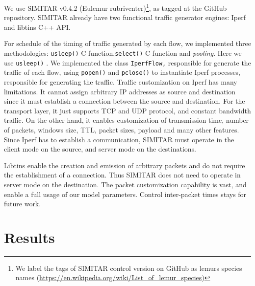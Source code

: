 We use SIMITAR v0.4.2 (Eulemur rubriventer)\footnote{ We label the tags of SIMITAR control version on GitHub as lemurs species names (\href{https://en.wikipedia.org/wiki/List_of_lemur_species}{https://en.wikipedia.org/wiki/List\_of\_lemur\_species})}, as tagged at the GitHub repository.  SIMITAR already have two functional traffic generator engines: Iperf and libtins C++ API.  

For schedule of the timing of traffic generated by each flow, we implemented three methodologies: \texttt{usleep()} C function,\texttt{select()} C function and \textit{pooling}. Here we use \texttt{usleep()} . We implemented the class \texttt{IperfFlow,} responsible for generate the traffic of each flow, using \texttt{popen()} and \texttt{pclose()} to instantiate Iperf processes, responsible for generating the traffic. Traffic customization on Iperf has many limitations. It cannot assign arbitrary IP addresses as source and destination since it must establish a connection between the source and destination. For the transport layer, it just supports TCP and UDP protocol, and constant bandwidth traffic. On the other hand, it enables customization of transmission time, number of packets, windows size, TTL, packet sizes, payload and many other features. Since Iperf has to establish a communication, SIMITAR must operate in the client mode on the source, and server mode on the destinations.

Libtins enable the creation and emission of arbitrary packets and do not require the establishment of a connection.  Thus SIMITAR does not need to operate in server mode on the destination. The packet customization capability is vast, and enable a full usage of our model parameters. Control inter-packet times stays for future work. 

\section{Results}


